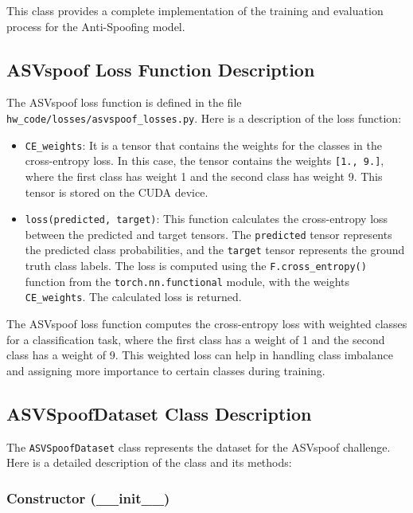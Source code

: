 \documentclass[a4paper]{article}
\begin{document}
This class provides a complete implementation of the training and evaluation process for the Anti-Spoofing model.

\subsection{ASVspoof Loss Function Description}

The ASVspoof loss function is defined in the file \texttt{hw\_code/losses/asvspoof\_losses.py}. Here is a description of the loss function:

\begin{itemize}
    \item \texttt{CE\_weights}: It is a tensor that contains the weights for the classes in the cross-entropy loss. In this case, the tensor contains the weights \texttt{[1., 9.]}, where the first class has weight 1 and the second class has weight 9. This tensor is stored on the CUDA device.
    \item \texttt{loss(predicted, target)}: This function calculates the cross-entropy loss between the predicted and target tensors. The \texttt{predicted} tensor represents the predicted class probabilities, and the \texttt{target} tensor represents the ground truth class labels. The loss is computed using the \texttt{F.cross\_entropy()} function from the \texttt{torch.nn.functional} module, with the weights \texttt{CE\_weights}. The calculated loss is returned.
\end{itemize}

The ASVspoof loss function computes the cross-entropy loss with weighted classes for a classification task, where the first class has a weight of 1 and the second class has a weight of 9. This weighted loss can help in handling class imbalance and assigning more importance to certain classes during training.

\subsection{ASVSpoofDataset Class Description}

The \texttt{ASVSpoofDataset} class represents the dataset for the ASVspoof challenge. Here is a detailed description of the class and its methods:

\subsubsection{Constructor (\_\_init\_\_)}
\end{document}
